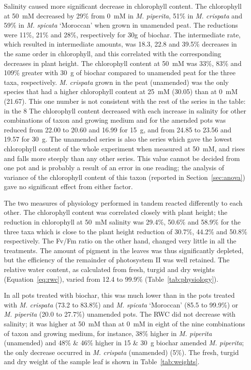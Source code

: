 Salinity caused more significant decrease in chlorophyll content. The chlorophyll at 50~mM decreased by 29\% from 0~mM in \textit{M. piperita}, 51\% in \textit{M. crispata} and 59\% in \textit{M. spicata} `Moroccan' when grown in unamended peat. The reductions were 11\%, 21\% and 28\%, respectively for 30g of biochar. The intermediate rate, which resulted in intermediate amounts, was 18.3, 22.8 and 39.5\% decreases in the same order in chlorophyll, and this correlated with the corresponding decreases in plant height. The chlorophyll content at 50~mM was 33\%, 83\% and 109\% greater with 30~g of biochar compared to unamended peat for the three taxa, respectively. \textit{M. crispata} grown in the peat (unamended) was the only species that had a higher chlorophyll content at 25~mM (30.05) than at 0~mM (21.67). This one number is not consistent with the rest of the series in the table: in the 8 The chlorophyll content decreased with each increase in salinity for other combinations of taxon and growing medium and for the amended pots was reduced from 22.00 to 20.60 and 16.99 for 15~g, and from 24.85 to 23.56 and 19.57 for 30~g. The unamended series is also the series which gave the lowest chlorophyll content of the whole experiment when measured at 50~mM, and rises and falls more steeply than any other series. This value cannot be decided from one pot and is probably a result of an error in one reading; the analysis of variance of the chlorophyll content of this taxon (reported in Section~\ref{sec:anova}) gave no significant effect from either factor.

The two measures of physiology performed in tandem reacted differently to each other. The chlorophyll content was correlated closely with plant height; the reduction in chlorophyll at 50~mM salinity was 29.4\%, 50.6\% and 58.9\% for the three taxa which is close to the plant height reduction of 30.7\%, 44.2\% and 50.8\% respectively. The Fv/Fm ratio on the other hand, changed very little in all the treatments. The amount of pigment in the leaves was thus significantly depleted, but the efficiency of the remainder of photosystem II was well retained. The relative water content, as calculated from fresh, turgid and dry weights (Equation~\ref{eq:rwc}), varied from 12.4 to 99.9\% (Table~\ref{tab:physiology}).

In all pots treated with biochar, this was much lower than in the pots treated with \textit{M. crispata} (73.2 to 83.8\%) and \textit{M. spicata} `Moroccan' (85.5 to 99.9\%) or \textit{M. piperita} (20.0 to 27.7\%) unamended pots. The RWC did not decrease with salinity; it was higher at 50~mM than at 0~mM in eight of the nine combinations of taxon and growing medium, for instance, 38\% higher in \textit{M. piperita} (unamended) and 48\% \& 46\% higher in 15 \& 30~g biochar amended \textit{M. piperita}; the only decrease occurred in \textit{M. crispata} (unamended) (5\%). The fresh, turgid and dry weight of the sample leaf is shown in Table~\ref{tab:weights}.

